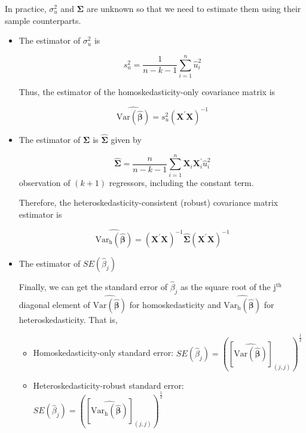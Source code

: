 \documentclass[a4paper,11pt]{article}
\newcommand{\var}{\mathrm{Var}}
\begin{document}
In practice, \(\sigma^2_u\) and \(\boldsymbol{\Sigma}\) are unknown so
that we need to estimate them using their sample counterparts.
\begin{itemize}
\item The estimator of \(\sigma^2_u\) is

\begin{equation}
\label{eq:sigma2u}
s^2_u = \frac{1}{n-k-1} \sum_{i=1}^n \hat{u}^2_i
\end{equation}

Thus, the estimator of the homoskedasticity-only covariance matrix
is

\begin{equation}
\label{eq:hat-vbhat-hm}
\widehat{\var(\hat{\boldsymbol{\beta}})} = s^2_u (\mathbf{X}^{\prime} \mathbf{X})^{-1}
\end{equation}

\item The estimator of \(\boldsymbol{\Sigma}\) is
\(\widehat{\boldsymbol{\Sigma}}\) given by

\begin{equation}
\label{eq:Sigmahat}
\widehat{\boldsymbol{\Sigma}} = \frac{n}{n-k-1} \sum_{i=1}^n
\mathbf{X}_i \mathbf{X}_i^{\prime} \hat{u}^2_i
\end{equation}
observation of \((k+1)\) regressors, including the constant term.

Therefore, the heteroskedasticity-consistent (robust) covariance
matrix estimator is

\begin{equation}
\label{eq:hat-vbhat-ht}
\widehat{\var_{\mathrm{h}}(\hat{\boldsymbol{\beta}})} = \left(\mathbf{X}^{\prime} \mathbf{X}\right)^{-1} \widehat{\boldsymbol{\Sigma}} (\mathbf{X}^{\prime} \mathbf{X})^{-1}
\end{equation}

\item The estimator of \(SE(\hat{\beta}_j)\)

Finally, we can get the standard error of \(\hat{\beta}_j\) as the
square root of the j\(^{\text{th}}\) diagonal element of
\(\widehat{\var(\hat{\boldsymbol{\beta}})}\) for homoskedasticity and
\(\widehat{\var_{\mathrm{h}}(\hat{\boldsymbol{\beta}})}\) for
heteroskedasticity. That is,

\begin{itemize}
\item Homoskedasticity-only standard error: \(SE(\hat{\beta}_j) =
    \left(\left[\widehat{\var(\hat{\boldsymbol{\beta}})}\right]_{(j,j)}\right)^{\frac{1}{2}}\)

\item Heteroskedasticity-robust standard error: \(SE(\hat{\beta}_j) =
    \left(\left[\widehat{\var_{\mathrm{h}}(\hat{\boldsymbol{\beta}})}\right]_{(j,j)}\right)^{\frac{1}{2}}\)
\end{itemize}
\end{itemize}
\end{document}
